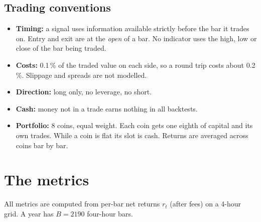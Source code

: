 \documentclass[11pt,a4paper]{article}
\begin{document}
\subsection{Trading conventions}
\begin{itemize}
\item \textbf{Timing:} a signal uses information available strictly before the bar it trades on. Entry and exit are at the \emph{open} of a bar.
No indicator uses the high, low or close of the bar being traded.
\item \textbf{Costs:} 0.1\,\% of the traded value on each side, so a round trip costs about 0.2\,\%. Slippage and spreads are not modelled.
\item \textbf{Direction:} long only, no leverage, no short.
\item \textbf{Cash:} money not in a trade earns nothing in all backtests.
\item \textbf{Portfolio:} 8 coins, equal weight. Each coin gets one eighth of capital and its own trades. While a coin is flat its slot is cash.
Returns are averaged across coins bar by bar.
\end{itemize}

\section{The metrics}
All metrics are computed from per-bar net returns $r_t$ (after fees) on a 4-hour grid. A year has $B=2190$ four-hour bars.
\end{document}
